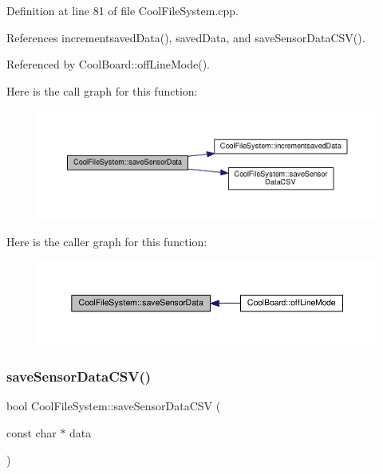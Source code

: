 Definition at line 81 of file Cool\+File\+System.\+cpp.



References incrementsaved\+Data(), saved\+Data, and save\+Sensor\+Data\+C\+S\+V().



Referenced by Cool\+Board\+::off\+Line\+Mode().

Here is the call graph for this function\+:
\nopagebreak
\begin{figure}[H]
\begin{center}
\leavevmode
\includegraphics[width=350pt]{db/d0c/class_cool_file_system_afa3a4feae94871d4d3b6bebb701c2e67_cgraph}
\end{center}
\end{figure}
Here is the caller graph for this function\+:
\nopagebreak
\begin{figure}[H]
\begin{center}
\leavevmode
\includegraphics[width=350pt]{db/d0c/class_cool_file_system_afa3a4feae94871d4d3b6bebb701c2e67_icgraph}
\end{center}
\end{figure}
\mbox{\label{class_cool_file_system_ab78704d5d21ce10fc6f1138ab5ab46c8}} 
\subsubsection{\texorpdfstring{save\+Sensor\+Data\+C\+S\+V()}{saveSensorDataCSV()}}
{\footnotesize\ttfamily bool Cool\+File\+System\+::save\+Sensor\+Data\+C\+SV (\begin{DoxyParamCaption}\item[{const char $\ast$}]{data }\end{DoxyParamCaption})}

